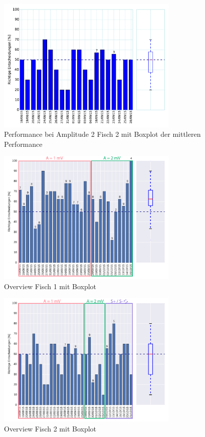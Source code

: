 \begin{figure}[ht]
\includegraphics[height=6.5cm]{Abbildungen/Amplitude1_Fisch2}
\caption{\label{fig:amplitude2_2} Performance bei Amplitude 2 Fisch 2 mit Boxplot der mittleren Performance}
\end{figure}

\begin{figure}[ht]
\includegraphics[height=6.5cm]{Abbildungen/Overview1}
\caption{\label{fig:amplitude1_1}Overview Fisch 1 mit Boxplot}
\end{figure}

\begin{figure}[ht]
\includegraphics[height=6.5cm]{Abbildungen/Overview2}
\caption{\label{fig:amplitude1_1}Overview Fisch 2 mit Boxplot}
\end{figure}

